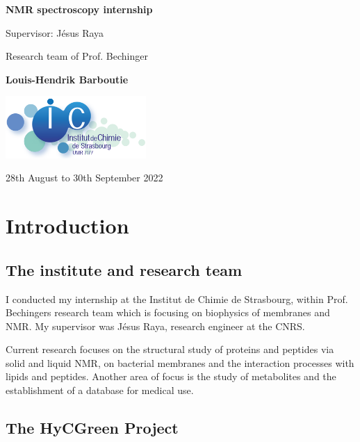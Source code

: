 \documentclass[12pt]{article}
\begin{document}
\begin{titlepage}
    \begin{center}
        \vspace*{1cm}
        \Huge
        \textbf{NMR spectroscopy internship}
        
        \vspace{0.5cm}
        \LARGE
        Supervisor: Jésus Raya
        
        Research team of Prof. Bechinger
        
        \vspace{1.5cm}
        \textbf{Louis-Hendrik Barboutie}
        
        \vfill
        

        \includegraphics[width=0.4\textwidth]{logo_institut.png}
        
        \Large
        28th August to 30th September 2022
    \end{center}
\end{titlepage}

\tableofcontents
\newpage
\listoffigures
\listoftables
\newpage

\section{Introduction}

\subsection{The institute and research team}

I conducted my internship at the Institut de Chimie de Strasbourg, within Prof. Bechingers research team which is focusing on biophysics of membranes and NMR. My supervisor was Jésus Raya, research engineer at the CNRS.

Current research focuses on the structural study of proteins and peptides via solid and liquid NMR, on bacterial membranes and the interaction processes with lipids and peptides. Another area of focus is the study of metabolites and the establishment of a database for medical use. 

\subsection{The HyCGreen Project}
\end{document}
